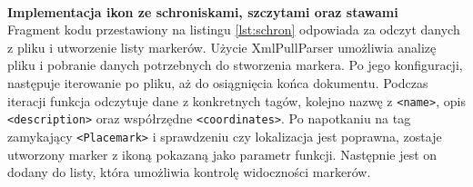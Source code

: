 \noindent
\begin{minipage}{\linewidth}
    \label{lst:pobierz}
    \centering
\end{minipage}\\


\noindent
\textbf{Implementacja ikon ze schroniskami, szczytami oraz stawami} \\ 
\indent Fragment kodu przestawiony na listingu \ref{lst:schron} odpowiada za odczyt danych z pliku i utworzenie listy markerów. Użycie XmlPullParser umożliwia analizę pliku i pobranie danych potrzebnych do stworzenia markera. Po jego konfiguracji, następuje iterowanie po pliku, aż do osiągnięcia końca dokumentu. Podczas iteracji funkcja odczytuje dane z konkretnych tagów, kolejno nazwę z \verb|<name>|, opis \verb|<description>| oraz współrzędne \verb|<coordinates>|. Po napotkaniu na tag zamykający \verb|<Placemark>| i sprawdzeniu czy lokalizacja jest poprawna, zostaje utworzony marker z ikoną pokazaną jako parametr funkcji. Następnie jest on dodany do listy, która umożliwia kontrolę widoczności markerów. \\

